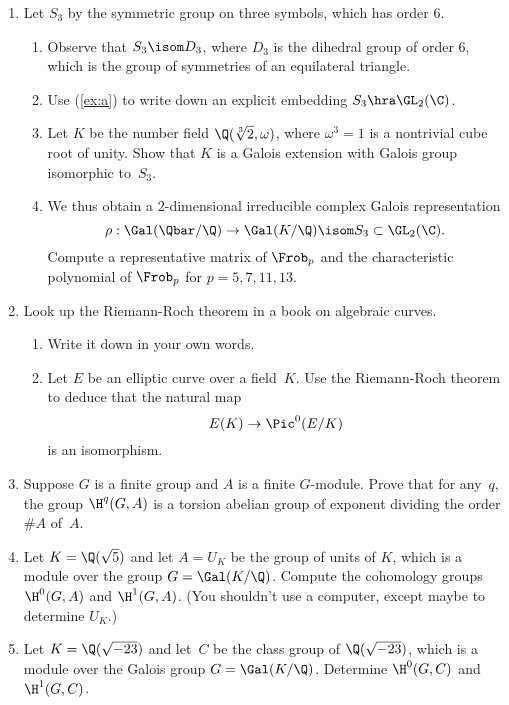 \begin{enumerate}
\item Let $S_3$ by the symmetric group on three symbols, which
has order $6$.
\begin{enumerate}
\item \label{ex:a} Observe that $S_3\isom D_3$, where $D_3$ is the dihedral group
of order $6$, which is the group of symmetries of an equilateral
triangle.
\item Use (\ref{ex:a}) to write down an explicit
embedding $S_3\hra \GL_2(\C)$.
\item Let $K$ be the number field $\Q(\sqrt[3]{2},\omega)$,
where $\omega^3=1$ is a nontrivial cube root of unity.  Show
that $K$ is a Galois extension with Galois group isomorphic to~$S_3$.
\item We thus obtain a $2$-dimensional irreducible complex
Galois representation
$$
\rho:\Gal(\Qbar/\Q) \to \Gal(K/\Q)\isom S_3 \subset \GL_2(\C).
$$
Compute a representative matrix of $\Frob_p$ and the characteristic polynomial
of $\Frob_p$ for $p=5,7,11,13$.  
\end{enumerate}




\item Look up the Riemann-Roch theorem in a book on algebraic curves.
\begin{enumerate}
\item Write it down in your own words.
\item Let $E$ be an elliptic curve over a field~$K$.
Use the Riemann-Roch theorem to deduce that the natural map
$$E(K) \to \Pic^0(E/K)$$
is an isomorphism.  
\end{enumerate}


\item Suppose $G$ is a finite group and $A$ is a finite $G$-module.
  Prove that for any~$q$, the group $\H^q(G,A)$ is a torsion abelian group of
  exponent dividing the order $\#A$ of~$A$.

\item Let $K=\Q(\sqrt{5})$ and let $A=U_K$ be the group of units of
  $K$, which is a module over the group $G=\Gal(K/\Q)$.  Compute the
  cohomology groups $\H^0(G,A)$ and $\H^1(G,A)$.  (You shouldn't use
  a computer, except maybe to determine $U_K$.)

\item Let $K=\Q(\sqrt{-23})$ and let~$C$ be the class group of
$\Q(\sqrt{-23})$, which is a module over the Galois group $G=\Gal(K/\Q)$. 
Determine $\H^0(G,C)$ and $\H^1(G,C)$.  


\end{enumerate}
